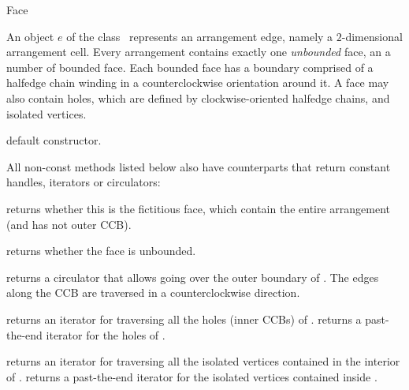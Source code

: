 
\ccRefPageBegin

\begin{ccRefClass}{Face}

\ccDefinition
An object $e$ of the class \ccRefName\ represents an arrangement edge,
namely a $2$-dimensional arrangement cell. Every arrangement contains
exactly one \emph{unbounded} face, an a number of bounded face. Each
bounded face has a boundary comprised of a halfedge chain winding in
a counterclockwise orientation around it. A face may also contain holes,
which are defined by clockwise-oriented halfedge chains, and isolated
vertices.

\ccInheritsFrom

\ccCreation
{}

   {default constructor.}    	    
    
\ccAccessFunctions

All non-const methods listed below also have  counterparts
that return constant handles, iterators or circulators:

    {returns whether this is the fictitious face, which contain the entire
     arrangement (and has not outer CCB).}

    {returns whether the face is unbounded.}    

    {returns a circulator that allows going over the outer boundary of
     \ccVar{}. The edges along the CCB are traversed in a counterclockwise
     direction.
     }
    
    {returns an iterator for traversing all the holes (inner CCBs) of
     \ccVar{}.}
\ccGlue
{}
    {returns a past-the-end iterator for the holes of \ccVar{}.}

    {returns an iterator for traversing all the isolated vertices
     contained in the interior of \ccVar{}.}
\ccGlue
{}
    {returns a past-the-end iterator for the isolated vertices 
     contained inside \ccVar{}.}

\end{ccRefClass}

\ccRefPageEnd